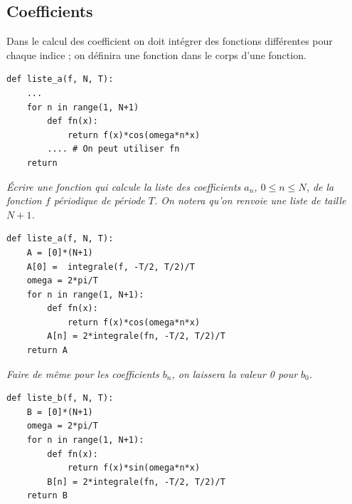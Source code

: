 \subsection{Coefficients}
Dans le calcul des coefficient on doit intégrer des fonctions différentes pour chaque indice ; on définira une fonction dans le corps d'une fonction.
\begin{lstlisting}
def liste_a(f, N, T):
    ...
    for n in range(1, N+1)
        def fn(x):
            return f(x)*cos(omega*n*x)
        .... # On peut utiliser fn
    return 
\end{lstlisting}
\begin{Exercise}\it
Écrire une fonction  qui calcule la liste des coefficients $a_n$, $0\le n\le N$, de la fonction $f$ périodique de période $T$. On notera qu'on renvoie une liste de taille $N+1$.
\end{Exercise}
\begin{Answer}
\begin{lstlisting}
def liste_a(f, N, T):
    A = [0]*(N+1)
    A[0] =  integrale(f, -T/2, T/2)/T
    omega = 2*pi/T
    for n in range(1, N+1):
        def fn(x):
            return f(x)*cos(omega*n*x)
        A[n] = 2*integrale(fn, -T/2, T/2)/T
    return A
\end{lstlisting}
\end{Answer}
\begin{Exercise}\it
Faire de même pour les coefficients $b_n$, on laissera la valeur 0 pour $b_0$.
\end{Exercise}
\begin{Answer}
\begin{lstlisting}
def liste_b(f, N, T):
    B = [0]*(N+1)
    omega = 2*pi/T
    for n in range(1, N+1):
        def fn(x):
            return f(x)*sin(omega*n*x)
        B[n] = 2*integrale(fn, -T/2, T/2)/T
    return B
\end{lstlisting}
\end{Answer}
